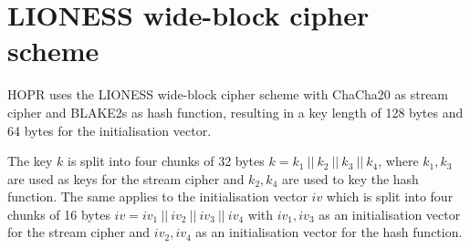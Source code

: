 \section{LIONESS wide-block cipher scheme}
\label{appendix:lioness}

HOPR uses the LIONESS \cite{lionesspaper} wide-block cipher scheme with ChaCha20 as stream cipher and BLAKE2s as hash function, resulting in a key length of 128 bytes and 64 bytes for the initialisation vector.

The key $k$ is split into four chunks of 32 bytes $k = k_1 \ || \ k_2 \ || \  k_3 \ || \ k_4$, where $k_1, k_3$ are used as keys for the stream cipher and $k_2, k_4$ are used to key the hash function. The same applies to the initialisation vector $iv$ which is split into four chunks of 16 bytes $iv = iv_1 \ || \ iv_2 \ || \  iv_3 \ || \ iv_4$ with $iv_1, iv_3$ as an initialisation vector for the stream cipher and $iv_2, iv_4$ as an initialisation vector for the hash function.

